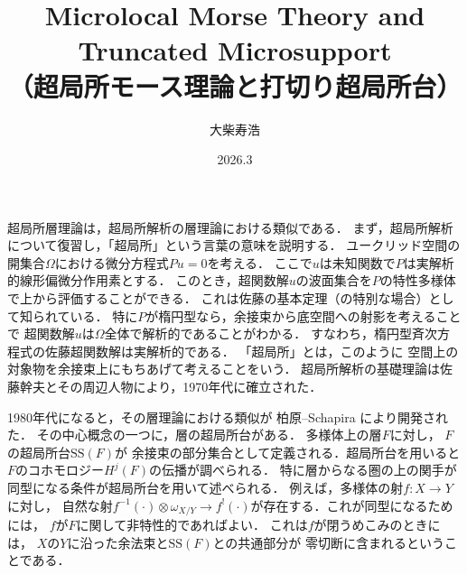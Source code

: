 ﻿\documentclass[a4paper]{jsarticle}
\title{Microlocal Morse Theory and Truncated Microsupport\\（超局所モース理論と打切り超局所台）}
\author{大柴寿浩}
\date{2026.3} %
\theoremstyle{definition}
\numberwithin{equation}{section}
\theoremstyle{mystyle}
\begin{document}
\begin{gaiyo}

  超局所層理論は，超局所解析の層理論における類似である．
  まず，超局所解析について復習し，「超局所」という言葉の意味を説明する．
  ユークリッド空間の開集合\(\varOmega\)における微分方程式\(Pu=0\)を考える．
  ここで\(u\)は未知関数で\(P\)は実解析的線形偏微分作用素とする．
  このとき，超関数解\(u\)の波面集合を\(P\)の特性多様体で上から評価することができる．
  これは佐藤の基本定理（の特別な場合）として知られている．
  特に\(P\)が楕円型なら，余接束から底空間への射影を考えることで
  超関数解\(u\)は\(\varOmega\)全体で解析的であることがわかる．
  すなわち，楕円型斉次方程式の佐藤超関数解は実解析的である．
  「超局所」とは，このように
  空間上の対象物を余接束上にもちあげて考えることをいう．
  超局所解析の基礎理論は佐藤幹夫とその周辺人物により，1970年代に確立された．

  1980年代になると，その層理論における類似が
  柏原--Schapira により開発された\cite{KS90}．
  その中心概念の一つに，層の超局所台がある．
  多様体上の層\(F\)に対し，
  \(F\)の超局所台\(\mathrm{SS}(F)\)が
  余接束の部分集合として定義される．超局所台を用いると
  \(F\)のコホモロジー\(H^{j}(F)\)の伝播が調べられる．
  特に層からなる圏の上の関手が
  同型になる条件が超局所台を用いて述べられる．
  例えば，多様体の射\(f\colon X\to Y\)に対し，
  自然な射\(
    f^{-1}(\cdot)\otimes \omega_{X/Y}
    \to f^{!}(\cdot)
  \)が存在する．これが同型になるためには，
  \(f\)が\(F\)に関して非特性的であればよい．
  これは\(f\)が閉うめこみのときには，
  \(X\)の\(Y\)に沿った余法束と\(\mathrm{SS}(F)\)との共通部分が
  零切断に含まれるということである．
  

\end{gaiyo}
\end{document}
